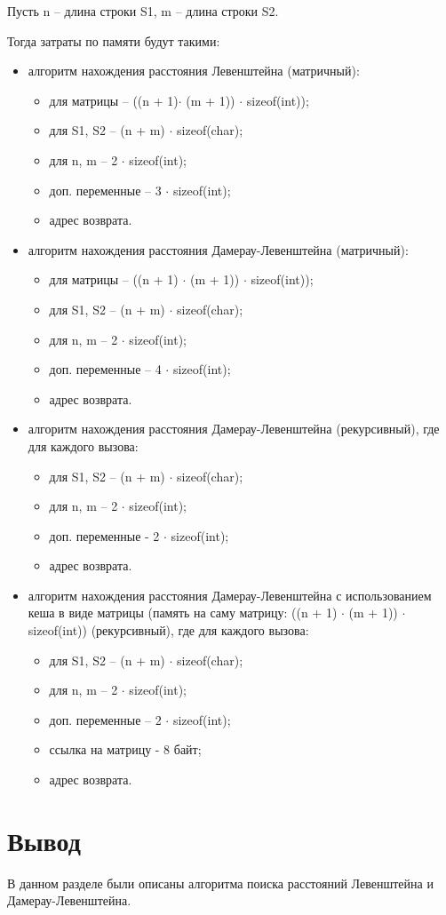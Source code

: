 Пусть n -- длина строки S1, m -- длина строки S2.

Тогда затраты по памяти будут такими:
\begin{itemize}
	\item алгоритм нахождения расстояния Левенштейна (матричный):
	
	\begin{itemize}
		\item для матрицы -- ((n + 1)$ \cdot$ (m + 1)) $ \cdot$ sizeof(int));
		\item для S1, S2 -- (n + m) $ \cdot$ sizeof(char);
		\item для n, m -- 2 $ \cdot$ sizeof(int);
		\item доп. переменные -- 3 $ \cdot$ sizeof(int);
		\item адрес возврата.
	\end{itemize}
	
	\item алгоритм нахождения расстояния Дамерау-Левенштейна (матричный):
	
	\begin{itemize}
		\item для матрицы -- ((n + 1) $ \cdot$ (m + 1)) $ \cdot$ sizeof(int));
		\item для S1, S2 -- (n + m) $ \cdot$ sizeof(char);
		\item для n, m -- 2 $ \cdot$ sizeof(int);
		\item доп. переменные -- 4 $ \cdot$ sizeof(int);
		\item адрес возврата.
	\end{itemize}
	
	\item алгоритм нахождения расстояния Дамерау-Левенштейна (рекурсивный), где для каждого вызова:
	
	\begin{itemize}
		\item для S1, S2 -- (n + m) $ \cdot$ sizeof(char);
		\item для n, m -- 2 $ \cdot$ sizeof(int);
		\item доп. переменные - 2 $ \cdot$ sizeof(int);
		\item адрес возврата.
	\end{itemize}
	
	\item алгоритм нахождения расстояния Дамерау-Левенштейна с использованием кеша в виде матрицы (память на саму матрицу: ((n + 1) $ \cdot$ (m + 1)) $ \cdot$ sizeof(int)) (рекурсивный), где для каждого вызова:
	
	\begin{itemize}
		\item для S1, S2 -- (n + m) $ \cdot$ sizeof(char);
		\item для n, m -- 2 $ \cdot$ sizeof(int);
		\item доп. переменные -- 2 $ \cdot$ sizeof(int);
		\item ссылка на матрицу - 8 байт;
		\item адрес возврата.
	\end{itemize}
	
\end{itemize}



\section*{Вывод}
В данном разделе были описаны алгоритма поиска расстояний Левенштейна и Дамерау-Левенштейна.